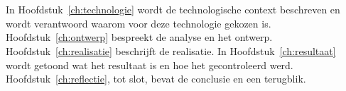 \section{}%
\label{sec:opbouw}

In Hoofdstuk~\ref{ch:technologie} wordt de technologische context beschreven
en wordt verantwoord waarom voor deze technologie gekozen is.
Hoofdstuk~\ref{ch:ontwerp} bespreekt de analyse en het ontwerp.
Hoofdstuk~\ref{ch:realisatie} beschrijft de realisatie.
In Hoofdstuk~\ref{ch:resultaat} wordt getoond wat het resultaat is en hoe het
gecontroleerd werd. Hoofdstuk~\ref{ch:reflectie}, tot slot, bevat de conclusie
en een terugblik.


